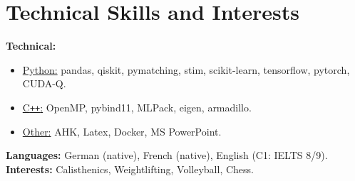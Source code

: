 \documentclass[10pt,a4paper,roman]{moderncv}        %
\makeatletter
\newcommand*{\customcventry}[5][.5em]{
  \begin{tabular}{@{}l} 
    {\bfseries #2}
  \end{tabular}
  \hfill%
  \begin{tabular}{l@{}}
     { #3}
  \end{tabular} \\
  \begin{tabular}{@{}l} 
    {\itshape\small #4}
  \end{tabular}
  \ifx&#5&%
  \else{\\%
    \begin{minipage}{0.82\maincolumnwidth}%
      \small#5%
    \end{minipage}}\fi%
  \par\addvspace{#1}}
\makeatother
\begin{document}










\section{Technical Skills and Interests}
\textbf{Technical:}
\begin{itemize}
\item \underline{Python:} pandas, qiskit, pymatching, stim, scikit-learn, tensorflow, pytorch, CUDA-Q.
\item \underline{C\texttt{++}:} OpenMP, pybind11, MLPack, eigen, armadillo.
\item\underline{Other:} AHK, Latex, Docker, MS PowerPoint.
\end{itemize}
\vspace*{0.1cm}
\textbf{Languages:} German (native), French (native), English (C1: IELTS 8/9).
\\
\textbf{Interests:} Calisthenics, Weightlifting, Volleyball, Chess.
\end{document}
